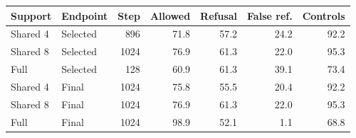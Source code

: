 \begin{tabular}{llrrrrr}
\toprule
Support & Endpoint & Step & Allowed & Refusal & False ref. & Controls \\
\midrule
Shared 4 & Selected & 896 & 71.8 & 57.2 & 24.2 & 92.2 \\
Shared 8 & Selected & 1024 & 76.9 & 61.3 & 22.0 & 95.3 \\
Full & Selected & 128 & 60.9 & 61.3 & 39.1 & 73.4 \\
Shared 4 & Final & 1024 & 75.8 & 55.5 & 20.4 & 92.2 \\
Shared 8 & Final & 1024 & 76.9 & 61.3 & 22.0 & 95.3 \\
Full & Final & 1024 & 98.9 & 52.1 & 1.1 & 68.8 \\
\bottomrule
\end{tabular}
